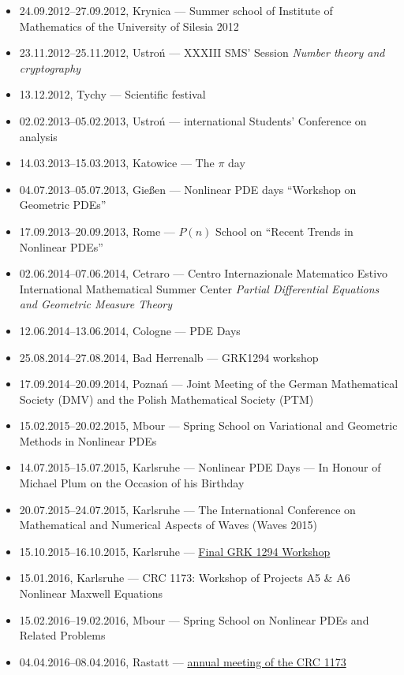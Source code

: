 \begin{itemize}
  \item 24.09.2012--27.09.2012, Krynica --- Summer school of Institute of Mathematics of the University of Silesia 2012
  \item 23.11.2012--25.11.2012, Ustroń --- XXXIII SMS' Session \textsl{Number theory and cryptography}
  \item 13.12.2012, Tychy --- Scientific festival
  \item 02.02.2013--05.02.2013, Ustroń ---  international Students' Conference on analysis
  \item 14.03.2013--15.03.2013, Katowice --- The $\pi$ day
  \item 04.07.2013--05.07.2013, Gießen --- Nonlinear PDE days ``Workshop on Geometric PDEs''
  \item 17.09.2013--20.09.2013, Rome --- $P(n)$ School on ``Recent Trends in Nonlinear PDEs''
  \item 02.06.2014--07.06.2014, Cetraro ---  Centro Internazionale Matematico Estivo International Mathematical Summer Center \textit{Partial Differential Equations and Geometric Measure Theory}
  \item 12.06.2014--13.06.2014, Cologne --- PDE Days
  \item 25.08.2014--27.08.2014, Bad Herrenalb --- GRK1294 workshop
  \item 17.09.2014--20.09.2014, Poznań --- Joint Meeting of the German Mathematical Society (DMV) and the Polish Mathematical Society (PTM)
  \item 15.02.2015--20.02.2015, Mbour --- Spring School on Variational and Geometric Methods in Nonlinear PDEs
  \item 14.07.2015--15.07.2015, Karlsruhe --- Nonlinear PDE Days --- In Honour of Michael Plum on the Occasion of his  Birthday
  \item 20.07.2015--24.07.2015, Karlsruhe --- The  International Conference on Mathematical and Numerical Aspects of Waves (Waves 2015)
  \item 15.10.2015--16.10.2015, Karlsruhe --- \href{https://www.math.kit.edu/grk1294/page/finalws/}{Final GRK 1294 Workshop}
  \item 15.01.2016, Karlsruhe --- CRC 1173: Workshop of Projects A5 \& A6 Nonlinear Maxwell Equations
  \item 15.02.2016--19.02.2016, Mbour --- Spring School on Nonlinear PDEs and Related Problems
  \item 04.04.2016--08.04.2016, Rastatt --- \href{\urlFirstAnnualCrc}{ annual meeting of the CRC 1173}

\end{itemize}
